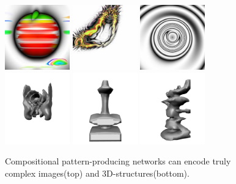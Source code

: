 \begin{figure}[t!]
\centering
\includegraphics[width=0.25\textwidth]{../Figures/Misc/picBreed3.jpg}\quad   
\includegraphics[width=0.25\textwidth]{../Figures/Misc/picBreed2.jpg}\quad
\includegraphics[width=0.25\textwidth]{../Figures/Misc/picBreed1.jpg}\\
\includegraphics[width=0.25\textwidth]{../Figures/Misc/endless2.png}\quad 
\includegraphics[width=0.25\textwidth]{../Figures/Misc/endless1.png}\quad
\includegraphics[width=0.25\textwidth]{../Figures/Misc/endless3.png}
\caption{Compositional pattern-producing networks can encode truly complex images\protect\footnotemark[1] (top) and 3D-structures\protect\footnotemark[2] (bottom).}
\label{fig:cppnImages}
\end{figure}

